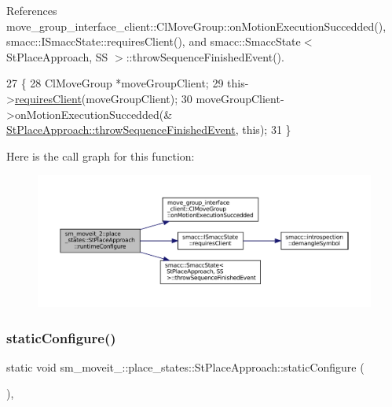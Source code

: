 References move\+\_\+group\+\_\+interface\+\_\+client\+::\+Cl\+Move\+Group\+::on\+Motion\+Execution\+Succedded(), smacc\+::\+I\+Smacc\+State\+::requires\+Client(), and smacc\+::\+Smacc\+State$<$ St\+Place\+Approach, S\+S $>$\+::throw\+Sequence\+Finished\+Event().


\begin{DoxyCode}
27     \{
28         ClMoveGroup *moveGroupClient;
29         this->\hyperlink{classsmacc_1_1ISmaccState_a7f95c9f0a6ea2d6f18d1aec0519de4ac}{requiresClient}(moveGroupClient);
30         moveGroupClient->onMotionExecutionSuccedded(&
      \hyperlink{classsmacc_1_1SmaccState_a49dcfc25824f7e083dd4b999c49ab2b6}{StPlaceApproach::throwSequenceFinishedEvent}, \textcolor{keyword}{this});
31     \}
\end{DoxyCode}
Here is the call graph for this function\+:
\nopagebreak
\begin{figure}[H]
\begin{center}
\leavevmode
\includegraphics[width=350pt]{structsm__moveit__2_1_1place__states_1_1StPlaceApproach_aeda5621011fedf4ba6582ea5e60cee3d_cgraph}
\end{center}
\end{figure}
\mbox{\label{structsm__moveit__2_1_1place__states_1_1StPlaceApproach_ab469a69222c3373956ecf728310bdab3}} 
\subsubsection{\texorpdfstring{static\+Configure()}{staticConfigure()}}
{\footnotesize\ttfamily static void sm\+\_\+moveit\+\_\+::place\+\_\+states\+::\+St\+Place\+Approach\+::static\+Configure (\begin{DoxyParamCaption}{ }\end{DoxyParamCaption})\hspace{0.3cm}{\ttfamily [inline]}, {\ttfamily [static]}}



